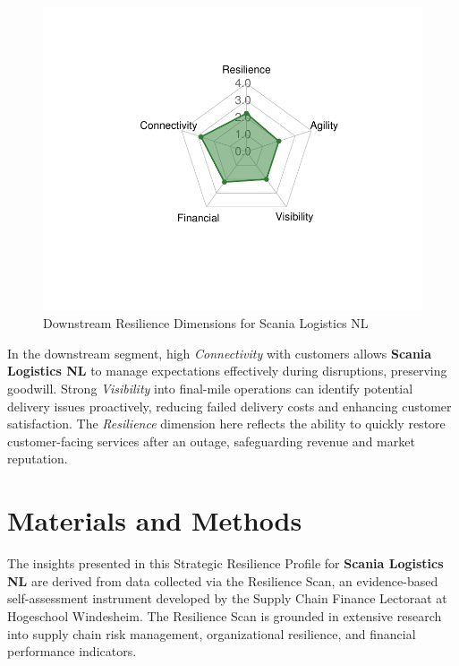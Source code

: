 \documentclass[
  oneside,
  open=any,
  fontsize=11pt]{scrbook}
\begin{document}
\begin{figure}[H]

{\centering \includegraphics[width=0.8\linewidth,height=\textheight,keepaspectratio]{example_3_files/figure-pdf/downstream-radar-chart-1.pdf}

}

\caption{Downstream Resilience Dimensions for Scania Logistics NL}

\end{figure}%

In the downstream segment, high \emph{Connectivity} with customers
allows \textbf{Scania Logistics NL} to manage expectations effectively
during disruptions, preserving goodwill. Strong \emph{Visibility} into
final-mile operations can identify potential delivery issues
proactively, reducing failed delivery costs and enhancing customer
satisfaction. The \emph{Resilience} dimension here reflects the ability
to quickly restore customer-facing services after an outage,
safeguarding revenue and market reputation.

\chapter{Materials and Methods}\label{materials-and-methods}

The insights presented in this Strategic Resilience Profile for
\textbf{Scania Logistics NL} are derived from data collected via the
Resilience Scan, an evidence-based self-assessment instrument developed
by the Supply Chain Finance Lectoraat at Hogeschool Windesheim. The
Resilience Scan is grounded in extensive research into supply chain risk
management, organizational resilience, and financial performance
indicators.
\end{document}
